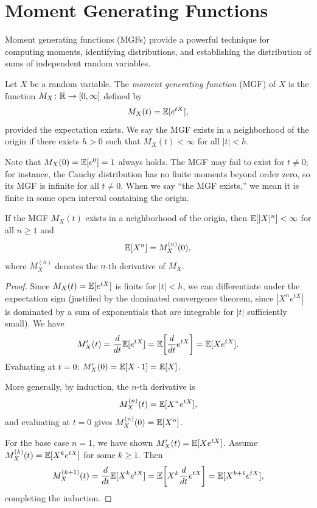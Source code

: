 \documentclass[11pt,a4paper]{article}
\begin{document}

\section{Moment Generating Functions}
\label{sec:mgf}

Moment generating functions (MGFs) provide a powerful technique for
computing moments, identifying distributions, and establishing the
distribution of sums of independent random variables.

\begin{definition}
\label{def:mgf}
Let $X$ be a random variable. The \emph{moment generating function}
(MGF) of $X$ is the function $M_X \colon \mathbb{R} \to [0, \infty]$ defined by
\[
    M_X(t) = \mathbb{E}[e^{tX}],
\]
provided the expectation exists. We say the MGF exists in a
neighborhood of the origin if there exists $h > 0$ such that
$M_X(t) < \infty$ for all $|t| < h$.
\end{definition}

\begin{remark}
\label{rem:mgf_exists}
Note that $M_X(0) = \mathbb{E}[e^0] = 1$ always holds. The MGF may fail to
exist for $t \neq 0$; for instance, the Cauchy distribution has no
finite moments beyond order zero, so its MGF is infinite for all
$t \neq 0$. When we say ``the MGF exists,'' we mean it is finite in
some open interval containing the origin.
\end{remark}

\begin{theorem}
\label{thm:moments_from_mgf}
If the MGF $M_X(t)$ exists in a neighborhood of the origin, then
$\mathbb{E}[|X|^n] < \infty$ for all $n \geq 1$ and
\[
    \mathbb{E}[X^n] = M_X^{(n)}(0),
\]
where $M_X^{(n)}$ denotes the $n$-th derivative of $M_X$.
\end{theorem}

\begin{proof}
Since $M_X(t) = \mathbb{E}[e^{tX}]$ is finite for $|t| < h$, we can
differentiate under the expectation sign (justified by the dominated
convergence theorem, since $|X^n e^{tX}|$ is dominated by a sum of
exponentials that are integrable for $|t|$ sufficiently small). We
have
\[
    M_X'(t) = \frac{d}{dt} \mathbb{E}[e^{tX}] = \mathbb{E}\!\left[\frac{d}{dt} e^{tX}\right]
    = \mathbb{E}[X e^{tX}].
\]
Evaluating at $t = 0$: $M_X'(0) = \mathbb{E}[X \cdot 1] = \mathbb{E}[X]$.

More generally, by induction, the $n$-th derivative is
\[
    M_X^{(n)}(t) = \mathbb{E}[X^n e^{tX}],
\]
and evaluating at $t = 0$ gives $M_X^{(n)}(0) = \mathbb{E}[X^n]$.

For the base case $n = 1$, we have shown $M_X'(t) = \mathbb{E}[Xe^{tX}]$.
Assume $M_X^{(k)}(t) = \mathbb{E}[X^k e^{tX}]$ for some $k \geq 1$. Then
\[
    M_X^{(k+1)}(t) = \frac{d}{dt} \mathbb{E}[X^k e^{tX}]
    = \mathbb{E}\!\left[X^k \frac{d}{dt} e^{tX}\right]
    = \mathbb{E}[X^{k+1} e^{tX}],
\]
completing the induction.
\end{proof}
\end{document}

